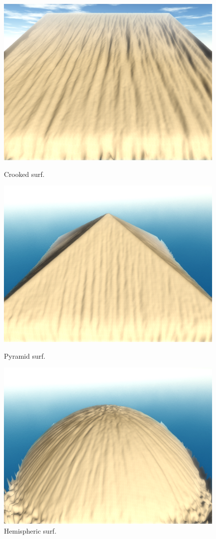 \documentclass[11pt,a4paper,twoside,openright]{report}
\begin{document}
\begin{figure}[!htb]
  \includegraphics[width=\linewidth]{sph-hydro-10mins-crooked.png}
  \caption{Crooked surf.}\label{fig:hydro4}
\endminipage\hfill
{}
  \includegraphics[width=\linewidth]{sph-hydro-10mins-pyramid.png}
  \caption{Pyramid surf.}\label{fig:hydro5}
\endminipage\hfill
{}%
  \includegraphics[width=\linewidth]{sph-hydro-10mins-hemisphere.png}
  \caption{Hemispheric surf.}\label{fig:hydro6}
\endminipage
\end{figure}
\end{document}
